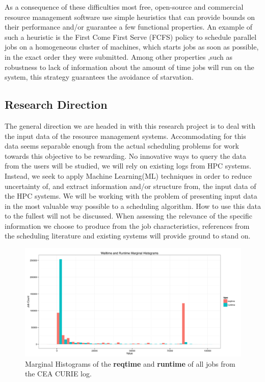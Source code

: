 \documentclass{article}
\begin{document}
As a consequence of these difficulties most free, open-source and commercial resource management software use simple heuristics that can provide bounds on their performance and/or guarantee a few functional properties.
An example of such a heuristic is the First Come First Serve (FCFS) policy to schedule parallel jobs on a homogeneous cluster of machines, which starts jobs as soon as possible, in the exact order they were submitted.
Among other properties ,such as robustness to lack of information about the amount of time jobs will run on the system, this strategy guarantees the avoidance of starvation.

\subsection{Research Direction}
The general direction we are headed in with this research project is to deal with the input data of the resource management systems.
Accommodating for this data seems separable enough from the actual scheduling problems for work towards this objective to be rewarding.
No innovative ways to query the data from the users will be studied, we will rely on existing logs from HPC systems. Instead, we seek to apply Machine Learning(ML) techniques in order to reduce uncertainty of, and extract information and/or structure from, the input data of the HPC systems.
We will be working with the problem of presenting input data in the most valuable way possible to a scheduling algorithm. How to use this data to the fullest will not be discussed.
When assessing the relevance of the specific information we choose to produce from the job characteristics, references from the scheduling literature and existing systems will provide ground to stand on.


\begin{figure}[b]
  \centering
  \includegraphics[width=\textwidth]{../../wallimage-0.png}
  \caption{Marginal Histograms of the \textbf{reqtime} and \textbf{runtime} of all jobs from the CEA CURIE log.}
  \label{fig:_wall_run_for_report_pdf}
\end{figure}
\end{document}
